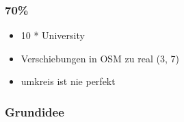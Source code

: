 
\begin{frame}
 \frametitle{70\%}
    \begin{itemize}
	\item 10 * University
	\item Verschiebungen in OSM zu real (3, 7)
	\item umkreis ist nie perfekt
    \end{itemize}
\end{frame}

\begin{frame}
 \frametitle{}
\end{frame}


\begin{frame} %
 \frametitle{Grundidee}
\end{frame}
